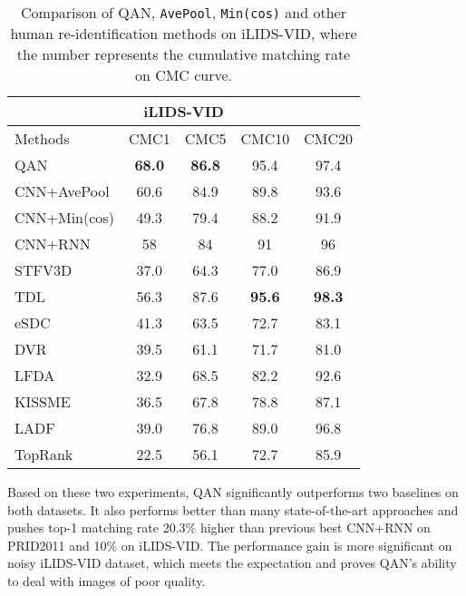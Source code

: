 \documentclass[10pt,twocolumn,letterpaper]{article}
\begin{document}
\begin{table}[!htb]
\normalsize
\centering
  \begin{tabular}{l|c|c|c|c}
\hline
     \multicolumn{5}{c}{iLIDS-VID}\\
\hline
       Methods & CMC1 &CMC5&CMC10 & CMC20   \\
\hline 

       QAN 	& \textbf{68.0} & \textbf{86.8} & 95.4 & 97.4  \\
       CNN+AvePool 		& 60.6 & 84.9 & 89.8 & 93.6 \\
       CNN+Min(cos) 		& 49.3 & 79.4 & 88.2 & 91.9  \\
\hline
       CNN+RNN\cite{wu2016deep} & 58 & 84 & 91 & 96 \\
       STFV3D\cite{liu2015spatio} & 37.0 & 64.3 & 77.0 & 86.9  \\
       TDL\cite{you2016top} 				& 56.3 & 87.6 & \textbf{95.6} & \textbf{98.3} \\
       eSDC\cite{wang2016person} 	& 41.3 & 63.5 & 72.7 & 83.1  \\
       DVR\cite{wang2016person} 				& 39.5 & 61.1 & 71.7 & 81.0 \\
       LFDA\cite{pedagadi2013local} 				& 32.9 & 68.5 & 82.2 & 92.6 \\
       KISSME\cite{koestinger2012large} 				& 36.5 & 67.8 & 78.8 & 87.1  \\
       LADF\cite{li2013learning} 				& 39.0 & 76.8 & 89.0 & 96.8  \\
       TopRank\cite{li2014top} 			& 22.5 & 56.1 & 72.7 & 85.9 \\
\hline
  \end{tabular}
  \caption{Comparison of QAN, \texttt{AvePool}, \texttt{Min(cos)} and other human re-identification methods on iLIDS-VID, where the number represents the cumulative matching rate on CMC curve.}
\label{tab2}
\end{table}

Based on these two experiments, QAN significantly outperforms two baselines on both datasets. It also performs better than many state-of-the-art approaches and pushes top-1 matching rate 20.3\% higher than previous best CNN+RNN\cite{wu2016deep} on PRID2011 and 10\%  on iLIDS-VID. The performance gain is more significant on noisy iLIDS-VID dataset, which meets the expectation and proves QAN's ability to deal with images of poor quality.
\end{document}
